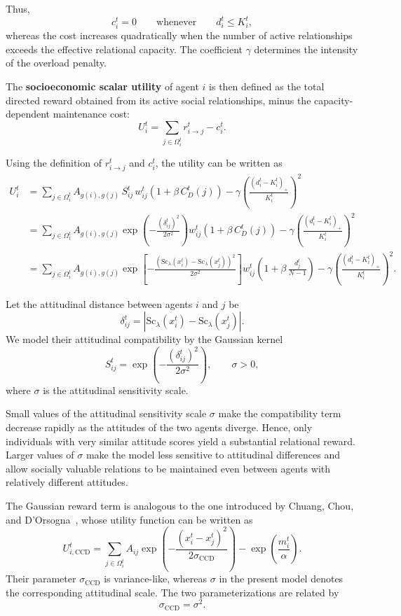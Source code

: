 \documentclass[11pt,a4paper]{article}
\newcommand{\score}{\mathrm{Sc}}
\newcommand{\Score}[2][]{\score_{#1}\!\left(#2\right)}
\begin{document}
	Thus,
	$$
	c_i^t=0
	\qquad\text{whenever}\qquad
	d_i^t\leq K_i^t,
	$$
	whereas the cost increases quadratically when the number of active
	relationships exceeds the effective relational capacity. The
	coefficient $\gamma$ determines the intensity of the overload
	penalty.
	
	The \textbf{socioeconomic scalar utility} of agent $i$ is then defined as the total directed reward obtained from its active social relationships, minus the capacity-dependent maintenance cost:
	$$
	U_i^t = \sum_{j\in\Omega_i^t}r_{i\to j}^t - c_i^t.
	$$
	
	Using the definition of $r_{i\to j}^t$ and $c_i^t$, the utility can be written as
	\begin{align*}
		U_i^t &= \sum_{j\in\Omega_i^t} A_{g(i),g(j)}
		\,S_{ij}^t \,w_{ij}^t \left(1 + \beta\, C_D^t(j)\right) - \gamma
		\left( \frac{(d_i^t-K_i^t)_+}{K_i^t} \right)^2 \\
		&= \sum_{j\in\Omega_i^t} A_{g(i),g(j)} \exp\left( - \frac{(\delta_{ij}^t)^2}{2\sigma^2} \right)
		w_{ij}^t \left( 1 + \beta \,C_D^t(j)\right)
		- \gamma \left( \frac{(d_i^t-K_i^t)_+}{K_i^t} \right)^2 \\[1ex]
		&= \sum_{j\in\Omega_i^t}A_{g(i),g(j)} \exp\left[
		- \frac{ \left( \Score[\lambda]{x_i^t} - \Score[\lambda]{x_j^t} \right)^2 }{2\sigma^2} \right]
		w_{ij}^t \left( 1 + \beta \, \frac{d_j^t}{N-1} \right) -
		\gamma \left( \frac{(d_i^t-K_i^t)_+}{K_i^t} \right)^2.
	\end{align*}

		Let the attitudinal distance between agents $i$ and $j$ be
		$$
		\delta_{ij}^t =
		\left|
		\Score[\lambda]{x_i^t}
		-
		\Score[\lambda]{x_j^t}
		\right|.
		$$
		We model their attitudinal compatibility by the Gaussian kernel
		$$
		S_{ij}^t =
		\exp\left(
		-\frac{(\delta_{ij}^t)^2}{2\sigma^2}
		\right),
		\qquad
		\sigma>0,
		$$
		where $\sigma$ is the attitudinal sensitivity scale. 

	Small values of  the attitudinal sensitivity scale $\sigma$ make the compatibility term decrease rapidly as the attitudes of the two agents diverge. Hence, only individuals with very similar attitude scores yield a substantial relational reward. Larger values of $\sigma$ make the model less sensitive to attitudinal differences and allow socially valuable relations to be maintained even between agents with relatively different attitudes.
	
	The Gaussian reward term is analogous to the one introduced by
	Chuang, Chou, and D'Orsogna~\cite{chuang2019}, whose utility function can be written as
	$$
	U_{i,\mathrm{CCD}}^t = \sum_{j\in\Omega_i^t} A_{ij} \exp\left(
	-\frac{(x_i^t-x_j^t)^2}{2\sigma_{\mathrm{CCD}}} \right) - \exp\left(\frac{m_i^t}{\alpha}\right).
	$$
	Their parameter $\sigma_{\mathrm{CCD}}$ is variance-like, whereas
	$\sigma$ in the present model denotes the corresponding attitudinal scale. The two parameterizations are related by
	$$
	\sigma_{\mathrm{CCD}}=\sigma^2.
	$$
	
\end{document}
